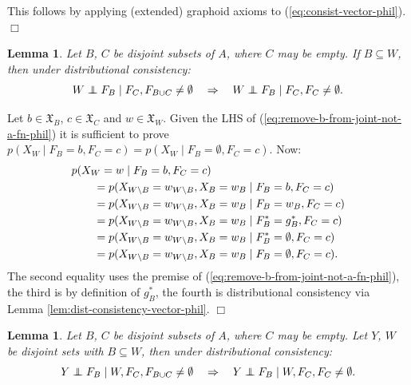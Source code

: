 \documentclass[11pt]{article}
\newtheorem{lemma}[theorem]{Lemma}
\newcommand\indep{\protect\mathpalette{\protect\independenT}{\perp}}
\def\independenT#1#2{\mathrel{\rlap{$#1#2$}\mkern2.5mu{#1#2}}}
\begin{document}
{ This follows by applying (extended) graphoid axioms to (\ref{eq:consist-vector-phil}).\hfill$\Box$

\begin{lemma}\label{lem:remove-b-from-joint-not-a-fn-phil}
Let $B$, $C$ be disjoint subsets of $A$, where $C$ may be empty. If $B\subseteq W$, then under distributional consistency: 
\begin{equation}\label{eq:remove-b-from-joint-not-a-fn-phil}
W \indep F_B \mid F_C, F_{B\cup C}\neq \emptyset \quad \Rightarrow\quad W \indep F_B \mid F_C, F_C\neq\emptyset.
\end{equation}
\end{lemma}

 Let $b\in \mathfrak{X}_B$, $c\in \mathfrak{X}_C$ and $w\in \mathfrak{X}_W$. 
 Given the LHS of (\ref{eq:remove-b-from-joint-not-a-fn-phil})
it is sufficient to prove  $p(X_{W}\mid F_B=b,F_C=c) = p(X_{W}\mid F_B=\emptyset,F_C=c)$. Now:
\begin{align*}
\MoveEqLeft{p(X_{W}=w\mid F_B=b,F_C=c)}\\
 &= p(X_{W\setminus B}=w_{W\setminus B}, X_{B}=w_{B} \mid F_B=b,F_C=c)\\ 
&= p(X_{W\setminus B}=w_{W\setminus B}, X_{B}=w_{B}\mid F_B=w_B, F_C=c)\\
&= p(X_{W\setminus B}=w_{W\setminus B}, X_{B}=w_{B}\mid F^*_B=g^*_B,F_C=c)\\
&= p(X_{W\setminus B}=w_{W\setminus B}, X_{B}=w_{B}\mid F^*_B=\emptyset, F_C=c)\\
&= p(X_{W\setminus B}=w_{W\setminus B}, X_{B}=w_{B}\mid F_B=\emptyset, F_C=c).
\end{align*}
The second equality uses the premise of (\ref{eq:remove-b-from-joint-not-a-fn-phil}), the third is by definition of $g^*_B$, the fourth
is distributional consistency via Lemma \ref{lem:dist-consistency-vector-phil}. \hfill$\Box$


\begin{lemma}\label{lem:remove-b-from-conditional-not-a-fn-phil}
Let $B$, $C$ be disjoint subsets of $A$, where $C$ may be empty.  Let $Y$, $W$ be disjoint sets with $B\subseteq W$,
then under distributional consistency:
\begin{equation}\label{eq:remove-b-from-conditional-not-a-fn-phil}
Y \indep F_B \mid W, F_C, F_{B\cup C}\neq \emptyset \quad \Rightarrow\quad Y \indep F_B \mid W, F_C, F_C\neq\emptyset.
\end{equation}
\end{lemma}

}
\end{document}
